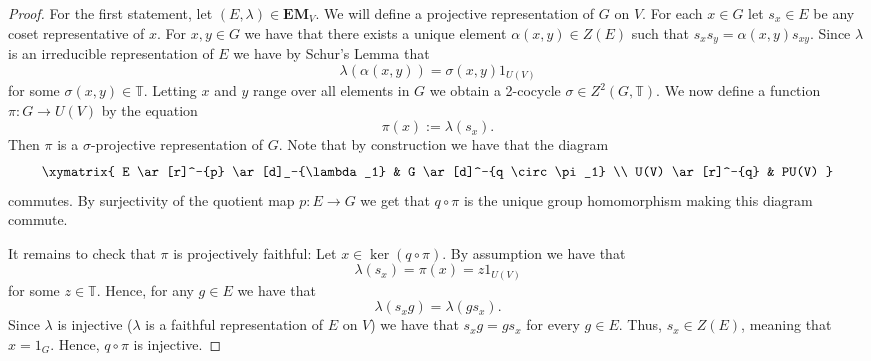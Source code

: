 \documentclass[11pt, oneside, reqno]{amsart}
\newcommand{\bbT}{\mathbb{T}}
\newcommand{\EM}{\mathbf{EM}}
\theoremstyle{definition}
\theoremstyle{plain}
\theoremstyle{remark}
\begin{document}
\begin{proof}
    For the first statement, let $(E,\lambda) \in \EM_V$. We will define a projective representation of $G$ on $V$. For each $x \in G$ let $s_x \in E$ be any coset representative of $x$. For $x,y \in G$ we have that there exists a unique element $\alpha(x,y) \in Z(E)$ such that $s_x s_y = \alpha(x,y) s_{xy}$. Since $\lambda$ is an irreducible representation of $E$ we have by Schur's Lemma that
    \begin{equation*}
        \lambda(\alpha(x,y)) = \sigma(x,y)1_{U(V)}
    \end{equation*}
    for some $\sigma(x,y) \in \bbT$. Letting $x$ and $y$ range over all elements in $G$ we obtain a 2-cocycle $\sigma \in Z^2(G,\bbT)$. We now define a function $\pi \colon G \to U(V)$ by the equation
    \begin{equation*}
        \pi(x) := \lambda(s_x).
    \end{equation*}
    Then $\pi$ is a $\sigma$-projective representation of $G$. Note that by construction we have that the diagram
    \begin{equation*}
        \xymatrix{
            E \ar[r]^-{p} \ar[d]_-{\lambda_1} & G \ar[d]^-{q \circ \pi_1} \\
            U(V) \ar[r]^-{q} & PU(V)
        }
    \end{equation*}
    commutes. By surjectivity of the quotient map $p \colon E \to G$ we get that $q \circ \pi$ is the unique group homomorphism making this diagram commute.
    
    It remains to check that $\pi$ is projectively faithful: Let $x \in \ker{(q \circ \pi)}$. By assumption we have that 
    \begin{equation*}
        \lambda(s_x) = \pi(x) = z 1_{U(V)}
    \end{equation*}
    for some $z \in \bbT$. Hence, for any $g \in E$ we have that
    \begin{equation*}
        \lambda(s_x g) = \lambda(g s_x).
    \end{equation*}
    Since $\lambda$ is injective ($\lambda$ is a faithful representation of $E$ on $V$) we have that $s_x g = g s_x$ for every $g \in E$. Thus, $s_x \in Z(E)$, meaning that $x = 1_{G}$. Hence, $q \circ \pi$ is injective.


\end{proof}
\end{document}
